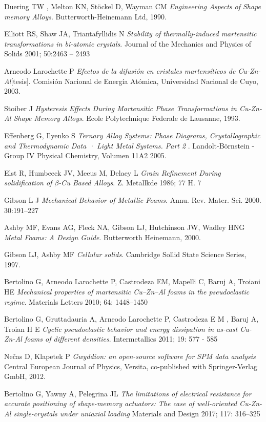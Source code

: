 \documentclass[a4paper,12pt,fleqn,twoside,openany]{book}
\begin{document}
\backmatter
\cleardoublepage
\begin{thebibliography}{3}

Duering TW , Melton KN, St{\"o}ckel D, Wayman CM
\textit{Engineering Aspects of Shape memory Alloys}. 
Butterworth-Heinemann Ltd, 1990.
 
Elliott RS, Shaw JA, Triantafyllidis N
\textit{Stability of thermally-induced martensitic
transformations in bi-atomic crystals}.
Journal of the Mechanics and Physics of Solids
2001; 50:2463 – 2493

Arneodo Larochette P
\textit{Efectos de la difusión en cristales martensíticos de Cu-Zn-Al}[tesis]. 
Comisión Nacional de Energía Atómica, Universidad Nacional de Cuyo, 2003.

Stoiber J
\textit{Hysteresis Effects During Martensitic Phase Transformations in Cu-Zn-Al Shape Memory Alloys}. 
Ecole Polytechnique Federale de Lausanne, 1993.

Effenberg G, Ilyenko S 
\textit{ Ternary Alloy Systems: Phase Diagrams, Crystallographic and Thermodynamic Data · Light Metal Systems. Part 2
}. 
Landolt-Börnstein - Group IV Physical Chemistry, Volumen 11A2 2005.

Elst R, Humbeeck JV, Meeus M, Delaey L
\textit{Grain Refinement During solidification of $\beta$-Cu Based Alloys}.
Z. Metallkde 1986; 77 H. 7

Gibson L J
\textit{Mechanical Behavior of Metallic Foams}.
Annu. Rev. Mater. Sci. 2000. 30:191–227

Ashby MF, Evans AG, Fleck NA, Gibson LJ, Hutchinson JW, Wadley HNG
\textit{Metal Foams: A Design Guide}. 
Butterworth Heinemann, 2000.

Gibson LJ, Ashby MF
\textit{Cellular solids}. 
Cambridge Sollid State Science Series, 1997.

Bertolino G, Arneodo Larochette P, Castrodeza EM, Mapelli C, Baruj A, Troiani HE
\textit{Mechanical properties of martensitic Cu–Zn–Al foams in the pseudoelastic regime}.
Materials Letters 2010; 64: 1448–1450

Bertolino G, Gruttadauria  A, Arneodo Larochette P, Castrodeza E M , Baruj A, Troian H E
\textit{Cyclic pseudoelastic behavior and energy dissipation in as-cast Cu-Zn-Al foams of
different densities}.
Intermetallics 2011; 19: 577 - 585

Nečas D, Klapetek P
\textit{Gwyddion: an open-source software for {SPM} data analysis}
Central European Journal of Physics, Versita, co-published with Springer-Verlag GmbH, 2012.


Bertolino G, Yawny A, Pelegrina JL
\textit{The limitations of electrical resistance for accurate positioning of
shape-memory actuators: The case of well-oriented Cu-Zn-Al
single-crystals under uniaxial loading}
Materials and Design 2017; 117: 316–325
\end{thebibliography}
\end{document}
